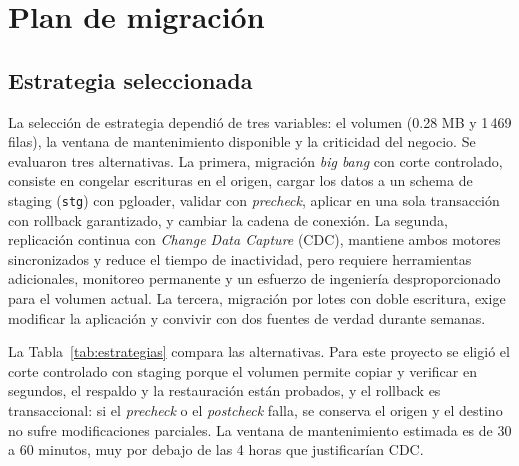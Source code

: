 
\section{Plan de migración}

\subsection{Estrategia seleccionada}

La selección de estrategia dependió de tres variables: el volumen (0.28 MB y
1\,469 filas), la ventana de mantenimiento disponible y la criticidad del
negocio. Se evaluaron tres alternativas. La primera, migración \emph{big bang}
con corte controlado, consiste en congelar escrituras en el origen, cargar los
datos a un schema de staging (\texttt{stg}) con pgloader, validar con
\emph{precheck}, aplicar en una sola transacción con rollback garantizado, y
cambiar la cadena de conexión. La segunda, replicación continua con
\emph{Change Data Capture} (CDC), mantiene ambos motores sincronizados y
reduce el tiempo de inactividad, pero requiere herramientas adicionales,
monitoreo permanente y un esfuerzo de ingeniería desproporcionado para el
volumen actual. La tercera, migración por lotes con doble escritura, exige
modificar la aplicación y convivir con dos fuentes de verdad durante semanas.

La Tabla~\ref{tab:estrategias} compara las alternativas. Para este proyecto se
eligió el corte controlado con staging porque el volumen permite copiar y
verificar en segundos, el respaldo y la restauración están probados, y el
rollback es transaccional: si el \emph{precheck} o el \emph{postcheck} falla,
se conserva el origen y el destino no sufre modificaciones parciales. La
ventana de mantenimiento estimada es de 30 a 60 minutos, muy por debajo de las
4 horas que justificarían CDC.

